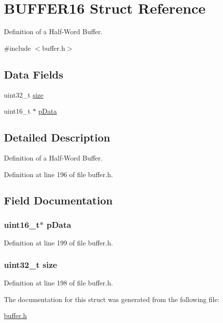 \hypertarget{a00002}{
\section{BUFFER16 Struct Reference}
\label{a00002}
}


Definition of a Half-\/Word Buffer.  




{\ttfamily \#include $<$buffer.h$>$}

\subsection*{Data Fields}
\begin{DoxyCompactItemize}
\item 
uint32\_\-t \hyperlink{a00002_ab2c6b258f02add8fdf4cfc7c371dd772}{size}
\item 
uint16\_\-t $\ast$ \hyperlink{a00002_a211763a6d528fa1aadb5a5f153069683}{pData}
\end{DoxyCompactItemize}


\subsection{Detailed Description}
Definition of a Half-\/Word Buffer. 

Definition at line 196 of file buffer.h.



\subsection{Field Documentation}
\hypertarget{a00002_a211763a6d528fa1aadb5a5f153069683}{
\subsubsection[{pData}]{\setlength{\rightskip}{0pt plus 5cm}uint16\_\-t$\ast$ {\bf pData}}}
\label{a00002_a211763a6d528fa1aadb5a5f153069683}


Definition at line 199 of file buffer.h.

\hypertarget{a00002_ab2c6b258f02add8fdf4cfc7c371dd772}{
\subsubsection[{size}]{\setlength{\rightskip}{0pt plus 5cm}uint32\_\-t {\bf size}}}
\label{a00002_ab2c6b258f02add8fdf4cfc7c371dd772}


Definition at line 198 of file buffer.h.



The documentation for this struct was generated from the following file:\begin{DoxyCompactItemize}
\item 
\hyperlink{a00465}{buffer.h}\end{DoxyCompactItemize}
